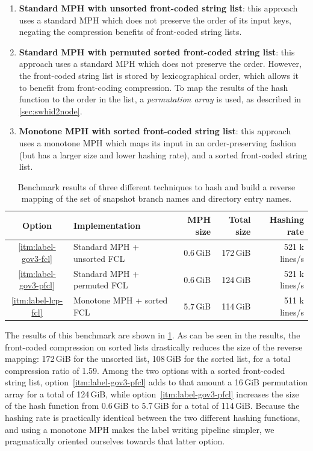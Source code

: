 \begin{enumerate}
    \item\label{itm:label-gov3-fcl}
        \textbf{Standard \gls{MPH} with unsorted front-coded string list}: this
        approach uses a standard \gls{MPH} which does not preserve the order of
        its input keys, negating the compression benefits of front-coded string
        lists.
    \item\label{itm:label-gov3-pfcl}
        \textbf{Standard \gls{MPH} with permuted sorted front-coded string
        list}: this approach uses a standard \gls{MPH} which does not preserve
        the order. However, the front-coded string list is stored by
        lexicographical order, which allows it to benefit from front-coding
        compression. To map the results of the hash function to the order in
        the list, a \emph{permutation array} is used, as described in
        \cref{sec:swhid2node}.
    \item\label{itm:label-lcp-fcl}
        \textbf{Monotone \gls{MPH} with sorted front-coded string list}: this
        approach uses a monotone \gls{MPH} which maps its input in an
        order-preserving fashion (but has a larger size and lower hashing
        rate), and a sorted front-coded string list.
\end{enumerate}

\begin{table}[b]
    \centering
    \caption{Benchmark results of three different techniques to hash and build
        a reverse mapping of the set of snapshot branch names and directory
        entry names.}%
    \label{tab:label-mph-benchmark}
    \begin{tabular}{c l r r r}
        \textbf{Option} & \textbf{Implementation} & \textbf{MPH size} & \textbf{Total size} & \textbf{Hashing rate} \\ \hline
        {\ref{itm:label-gov3-fcl}} & Standard MPH + unsorted FCL & 0.6\,GiB & 172\,GiB & 521 k lines/s \\
        {\ref{itm:label-gov3-pfcl}} & Standard MPH + permuted FCL & 0.6\,GiB & 124\,GiB & 521 k lines/s \\
        {\ref{itm:label-lcp-fcl}} & Monotone MPH + sorted FCL & 5.7\,GiB & 114\,GiB & 511 k lines/s
    \end{tabular}
\end{table}

The results of this benchmark are shown in \cref{tab:label-mph-benchmark}. As
can be seen in the results, the front-coded compression on sorted lists
drastically reduces the size of the reverse mapping: 172\,GiB for the unsorted
list, 108\,GiB for the sorted list, for a total compression ratio of 1.59.
Among the two options with a sorted front-coded string list,
option~\ref{itm:label-gov3-pfcl} adds to that amount a 16\,GiB permutation
array for a total of 124\,GiB, while option~\ref{itm:label-gov3-pfcl} increases
the size of the hash function from 0.6\,GiB to 5.7\,GiB for a total of
114\,GiB. Because the hashing rate is practically identical between the two
different hashing functions, and using a monotone \gls{MPH} makes the label
writing pipeline simpler, we pragmatically oriented ourselves towards that
latter option.

